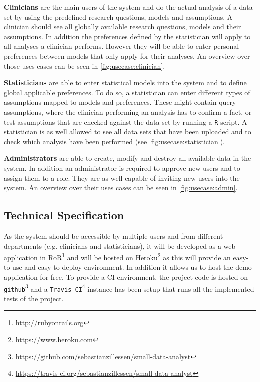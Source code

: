 \textbf{Clinicians} are the main users of the system and do the actual analysis of a data set by using the predefined research questions, models and assumptions. A clinician should see all globally available research questions, models and their assumptions. In addition the preferences defined by the statistician will apply to all analyses a clinician performs. However they will be able to enter personal preferences between models that only apply for their analyses. An overview over those uses cases can be seen in \autoref{fig:usecase:clinician}.

\textbf{Statisticians} are able to enter statistical models into the system and to define global applicable preferences. To do so, a statistician can enter different types of assumptions mapped to models and preferences. These might contain query assumptions, where the clinician performing an analysis has to confirm a fact, or test assumptions that are checked against the data set by running a \texttt{R}-script. A statistician is as well allowed to see all data sets that have been uploaded and to check which analysis have been performed (see \autoref{fig:usecase:statistician}).



\textbf{Administrators} are able to create, modify and destroy all available data in the system. In addition an administrator is required to approve new users and to assign them to a role. They are as well capable of inviting new users into the system. An overview over their uses cases can be seen in \autoref{fig:usecase:admin}.



\subsection{Technical Specification}
\label{sub:technical}

As the system should be accessible by multiple users and from different departments (e.g. clinicians and statisticians), it will be developed as a web-application in \gls{RoR}\footnote{\url{http://rubyonrails.org}} and will be hosted on Heroku\footnote{\url{https://www.heroku.com}} as this will provide an easy-to-use and easy-to-deploy environment. In addition it allows us to host the demo application for free. To provide a \gls{CI} environment, the project code is hosted on \texttt{github}\footnote{\url{https://github.com/sebastianzillessen/small-data-analyst}} and a \texttt{Travis CI}\footnote{\url{https://travis-ci.org/sebastianzillessen/small-data-analyst}} instance has been setup that runs all the implemented tests of the project.

